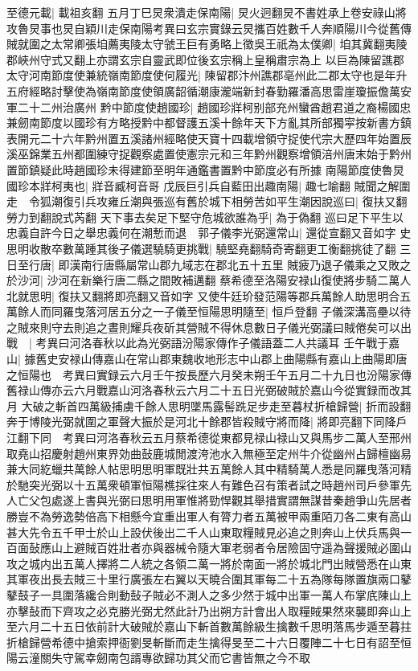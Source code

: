 至德元載|{
	載祖亥翻}
五月丁巳炅衆潰走保南陽|{
	炅火迥翻炅不書姓承上卷安祿山將攻魯炅事也炅自穎川走保南陽考異曰玄宗實錄云炅攜百姓數千人奔順陽川今從舊傳}
賊就圍之太常卿張垍薦夷陵太守虢王巨有勇略上徵吳王祇為太僕卿|{
	垍其冀翻夷陵郡峽州守式又翻上亦謂玄宗自靈武即位後玄宗稱上皇稱肅宗為上}
以巨為陳留譙郡太守河南節度使兼統嶺南節度使何履光|{
	陳留郡汴州譙郡亳州此二郡太守也是年升五府經略討擊使為嶺南節度使領廣韶循潮康瀧端新封春勤羅潘高思雷崖瓊振儋萬安軍二十二州治廣州}
黔中節度使趙國珍|{
	趙國珍牂柯别部充州蠻酋趙君道之裔楊國忠兼劒南節度以國珍有方略授黔中都督護五溪十餘年天下方亂其所部獨寜按新書方鎮表開元二十六年黔州置五溪諸州經略使天寶十四載增領守捉使代宗大歷四年始置辰溪巫錦業五州都圍練守捉觀察處置使憲宗元和三年黔州觀察增領涪州唐末始于黔州置節鎮疑此時趙國珍未得建節至明年通鑑書置黔中節度必有所據}
南陽節度使魯炅國珍本牂柯夷也|{
	牂音臧柯音哥}
戊辰巨引兵自藍田出趣南陽|{
	趣七喻翻}
賊聞之解圍走　令狐潮復引兵攻雍丘潮與張巡有舊於城下相勞苦如平生潮因說巡曰|{
	復扶又翻勞力到翻說式芮翻}
天下事去矣足下堅守危城欲誰為乎|{
	為于偽翻}
巡曰足下平生以忠義自許今日之舉忠義何在潮慙而退　郭子儀李光弼還常山|{
	還從宣翻又音如字}
史思明收散卒數萬踵其後子儀選驍騎更挑戰|{
	驍堅堯翻騎奇寄翻更工衡翻挑徒了翻}
三日至行唐|{
	即漢南行唐縣屬常山郡九域志在郡北五十五里}
賊疲乃退子儀乘之又敗之於沙河|{
	沙河在新樂行唐二縣之間敗補邁翻}
蔡希德至洛陽安禄山復使將步騎二萬人北就思明|{
	復扶又翻將即亮翻又音如字}
又使牛廷玠發范陽等郡兵萬餘人助思明合五萬餘人而同羅曳落河居五分之一子儀至恒陽思明隨至|{
	恒戶登翻}
子儀深溝高壘以待之賊來則守去則追之晝則耀兵夜斫其營賊不得休息數日子儀光弼議曰賊倦矣可以出戰　|{
	考異曰河洛春秋以此為光弼語汾陽家傳作子儀語蓋二人共議耳}
壬午戰于嘉山|{
	據舊史安禄山傳嘉山在常山郡東魏收地形志中山郡上曲陽縣有嘉山上曲陽即唐之恒陽也　考異曰實録云六月壬午按長歷六月癸未朔壬午五月二十九日也汾陽家傳舊禄山傳亦云六月戰嘉山河洛春秋云六月二十五日光弼破賊於嘉山今從實録而改其月}
大破之斬首四萬級捕虜千餘人思明墜馬露髻跣足步走至暮杖折槍歸營|{
	折而設翻}
奔于博陵光弼就圍之軍聲大振於是河北十餘郡皆殺賊守將而降|{
	將即亮翻下同降戶江翻下同　考異曰河洛春秋云五月蔡希德從東都見禄山禄山又與馬步二萬人至邢州取堯山招慶射趙州東界効曲鼔鹿城閒渡洿池水入無極至定州牛介從幽州占歸檀幽易兼大同紇蠟共萬餘人帖思明思明軍既壯共五萬餘人其中精騎萬人悉是同羅曳落河精於馳突光弼以十五萬衆頓軍恒陽樵採往來人有難色召有策者試之時趙州司戶參軍先人亡父包處遂上書與光弼曰思明用軍惟將勁悍觀其舉措實謂無謀昔秦趙爭山先居者勝豈不為勞逸勢倍高下相懸今宜重出軍人有膂力者五萬被甲兩重陌刀各二東有高山甚大先令五千甲士於山上設伏後出二千人山東取糧賊見必追之則奔山上伏兵馬與一百面鼔應山上避賊百姓壯者亦與器械令隨大軍老弱者令居險固守遥為聲援賊必圍山攻之城内出五萬人擇將二人統之各領二萬一將於南面一將於城北門出賊營悉在山東其軍夜出長去賊三十里行廣張左右翼以天曉合圍其軍每二十五為隊每隊置旗兩口鼕鼕鼓子一具圍落纔合則動鼔子賊必不測人之多少然于城中出軍一萬人布掌㡳陳山上亦擊鼔而下齊攻之必克勝光弼尤然此計乃出朔方計會出人取糧賊果然來襲即奔山上至六月二十五日依前計大破賊於嘉山下斬首數萬餘級生擒數千思明落馬步遁至暮拄折槍歸營希德中搶索押衙劉旻斬斷而走生擒得旻至二十六日覆陣二十七日有詔至恒陽云潼關失守駕幸劒南包諝專欲歸功其父而它書皆無之今不取}
